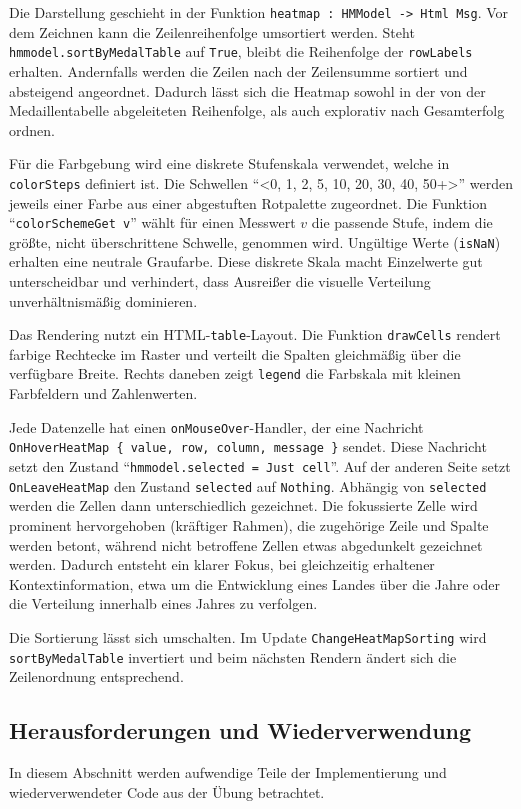 Die Darstellung geschieht in der Funktion \texttt{heatmap : HMModel -> Html Msg}. Vor dem Zeichnen kann die Zeilenreihenfolge umsortiert werden. Steht \texttt{hmmodel.sortByMedalTable} auf \texttt{True}, bleibt die Reihenfolge der \texttt{rowLabels} erhalten. Andernfalls werden die Zeilen nach der Zeilensumme sortiert und absteigend angeordnet. Dadurch lässt sich die Heatmap sowohl in der von der Medaillentabelle abgeleiteten Reihenfolge, als auch explorativ nach Gesamterfolg ordnen.

Für die Farbgebung wird eine diskrete Stufenskala verwendet, welche in \texttt{colorSteps} definiert ist. Die Schwellen \enquote{<0, 1, 2, 5, 10, 20, 30, 40, 50+>} werden jeweils einer Farbe aus einer abgestuften Rotpalette zugeordnet. Die Funktion \enquote{\texttt{colorSchemeGet v}} wählt für einen Messwert \(v\) die passende Stufe, indem die größte, nicht überschrittene Schwelle, genommen wird. Ungültige Werte (\texttt{isNaN}) erhalten eine neutrale Graufarbe. Diese diskrete Skala macht Einzelwerte gut unterscheidbar und verhindert, dass Ausreißer die visuelle Verteilung unverhältnismäßig dominieren.

Das Rendering nutzt ein HTML-\texttt{table}-Layout. Die Funktion \texttt{drawCells} rendert farbige Rechtecke im Raster und verteilt die Spalten gleichmäßig über die verfügbare Breite. Rechts daneben zeigt \texttt{legend} die Farbskala mit kleinen Farbfeldern und Zahlenwerten.

Jede Datenzelle hat einen \texttt{onMouseOver}-Handler, der eine Nachricht \texttt{OnHoverHeatMap \{ value, row, column, message \}} sendet. Diese Nachricht setzt den Zustand \enquote{\texttt{hmmodel.selected = Just cell}}. Auf der anderen Seite setzt \texttt{OnLeaveHeatMap} den Zustand \texttt{selected} auf \texttt{Nothing}. Abhängig von \texttt{selected} werden die Zellen dann unterschiedlich gezeichnet. Die fokussierte Zelle wird prominent hervorgehoben (kräftiger Rahmen), die zugehörige Zeile und Spalte werden betont, während nicht betroffene Zellen etwas abgedunkelt gezeichnet werden. Dadurch entsteht ein klarer Fokus, bei gleichzeitig erhaltener Kontextinformation, etwa um die Entwicklung eines Landes über die Jahre oder die Verteilung innerhalb eines Jahres zu verfolgen.

Die Sortierung lässt sich umschalten. Im Update \texttt{ChangeHeatMapSorting} wird \texttt{sortByMedalTable} invertiert und beim nächsten Rendern ändert sich die Zeilenordnung entsprechend.

\subsection{Herausforderungen und Wiederverwendung}
In diesem Abschnitt werden aufwendige Teile der Implementierung und wiederverwendeter Code aus der Übung betrachtet.

